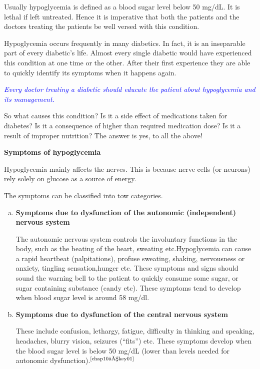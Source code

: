Usually hypoglycemia is defined as a blood sugar level below 50 mg/dL. It is lethal if left untreated. Hence it is imperative that both the patients and the doctors treating the patients be well versed with this condition.

Hypoglycemia occurs frequently in many diabetics. In fact, it is an inseparable part of every diabetic’s life. Almost every single diabetic would have experienced this condition at one time or the other. After their first experience they are able to quickly identify its symptoms when it happens again.

\textcolor{blue}{\textit{Every doctor treating a diabetic should educate the patient about hypoglycemia and its management.}}

So what causes this condition? Is it a side effect of medications taken for diabetes? Is it a consequence of higher than required medication dose? Is it a result of improper nutrition? The answer is yes, to all the above!

\noindent\textbf{Symptoms of hypoglycemia}

Hypoglycemia mainly affects the nerves. This is because nerve cells (or neurons) rely solely on glucose as a source of energy.

\noindent The symptoms can be classified into tow categories.

\begin{enumerate}[a)]
\itemsep=0pt
\item \textbf{Symptoms due to dysfunction of the autonomic (independent) nervous system}

The autonomic nervous system controls the involuntary functions in the body, such as the beating of the heart, sweating etc.\break Hypoglycemia can cause a rapid heartbeat (palpitations), profuse sweating, shaking, nervousness or anxiety, tingling sensation,\break hunger etc. These symptoms and signs should sound the warning bell to the patient to quickly consume some sugar, or sugar contai\-ning substance (candy etc). These symptoms tend to develop when blood sugar level is around 58 mg/dl.
 \item \textbf{Symptoms due to dysfunction of the central nervous system}

These include confusion, lethargy, fatigue, difficulty in thinking and speaking, headaches, blurry vision, seizures (“fits”) etc. These symptoms develop when the blood sugar level is below 50 mg/dL (lower than levels needed for autonomic dysfunction).$^{\text{\cite{chap10–key01}}}$
\end{enumerate}

